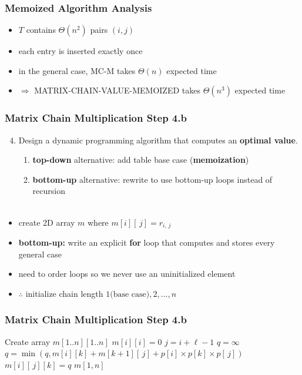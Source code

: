 \documentclass{beamer}
\newcommand{\stanza}{ \\~\ }
\begin{document}
\begin{frame} \frametitle{Memoized Algorithm Analysis}
  \begin{itemize}
    \item $T$ contains $\Theta(n^2)$ pairs $(i, j)$
    \item each entry is inserted exactly once
    \item in the general case, MC-M takes $\Theta(n)$ expected time
    \item $\Rightarrow$ MATRIX-CHAIN-VALUE-MEMOIZED takes $\Theta(n^3)$ expected time
  \end{itemize}
\end{frame}

\begin{frame} \frametitle{Matrix Chain Multiplication Step 4.b}
  \begin{enumerate}
    \setcounter{enumi}{3}
    \item Design a dynamic programming algorithm that computes an \textbf{optimal value}.
    \begin{enumerate}
      \item \textbf{top-down} alternative: add table base case (\textbf{memoization})
      \item \textbf{bottom-up} alternative: rewrite to use bottom-up loops instead of recursion
      \stanza
    \end{enumerate}
\end{enumerate}

\begin{itemize}
  \item create 2D array $m$ where $m[i][\, j] = r_{i, \, j}$
  \item \textbf{bottom-up:} write an explicit \textbf{for} loop that computes and stores every general case
  \item need to order loops so we never use an uninitialized element
  \item $\therefore$ initialize chain length $1 \text{(base case)}, 2, \ldots, n$
\end{itemize}
\end{frame}

\begin{frame} \frametitle{Matrix Chain Multiplication Step 4.b}
  {\small
  \begin{algorithmic}[1]
    \State Create array $m[1..n][1..n]$
      \State $m[i][i] = 0$ 
    \EndFor
     
        \State $j = i + \ell - 1$
        \State $q=\infty$
          \State $q = \min(q, m[i][k] + m[k+1][\,j] + p[i] \times p[k] \times p[\,j])$
        \EndFor
        \State $m[i][\,j][k] = q$
      \EndFor
    \EndFor
    \State \Return $m[1, n]$
    \EndFunction
  \end{algorithmic}
  }
\end{frame}
\end{document}
